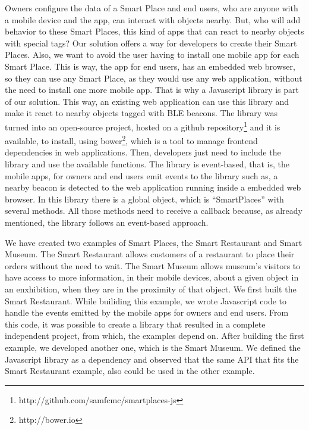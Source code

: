Owners configure the data of a Smart Place and end users, who are anyone with a mobile device and the app, can interact with objects nearby.
But, who will add behavior to these Smart Places, this kind of apps that can react to nearby objects with special tags?
Our solution offers a way for developers to create their Smart Places.
Also, we want to avoid the user having to install one mobile app for each Smart Place.
This is way, the app for end users,
has an embedded web browser, so they can use any Smart Place, as they would use any web application, without the need to install one more mobile app.
That is why a Javascript library is part of our solution.
This way, an existing web application can use this library and make it react to nearby objects tagged with \gls{BLE} beacons.
The library was turned into an open-source project, hosted on a github repository\footnote{http://github.com/samfcmc/smartplaces-js} and it is available, to install, using bower\footnote{http://bower.io}, which is a tool to manage frontend dependencies in web applications.
Then, developers just need to include the library and use the available functions.
The library is event-based, that is, the mobile apps, for owners and end users emit events to the library such as, a nearby beacon is detected to the web application running inside a embedded web browser.
In this library there is a global object, which is ``SmartPlaces'' with several methods.
All those methods need to receive a callback because, as already mentioned, the library follows an event-based approach.

We have created two examples of Smart Places, the Smart Restaurant and Smart Museum.
The Smart Restaurant allows customers of a restaurant to place their orders without the need to wait.
The Smart Museum allows museum's visitors to have access to more information, in their mobile devices, about a given object in an enxhibition, when they are in the proximity of that object.
We first built the Smart Restaurant.
While builiding this example, we wrote Javascript code to handle the events emitted by the mobile apps for owners and end users.
From this code, it was possible to create a library that resulted in a complete independent project, from which, the examples depend on.
After building the first example, we developed another one, which is the Smart Museum.
We defined the Javascript library as a dependency and observed that the same \gls{API} that fits the Smart Restaurant example, also could be used in the other example.
